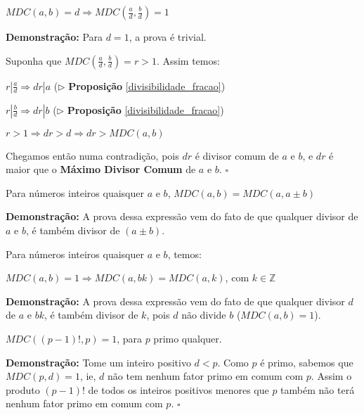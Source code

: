 \begin{proposition}\label{divisibilidade_mdc}
$MDC(a,b) = d \Rightarrow MDC(\frac{a}{d}, \frac{b}{d}) = 1$
\end{proposition}
\textbf{Demonstração:}
Para $d = 1$, a prova é trivial.

Suponha que $MDC(\frac{a}{d}, \frac{b}{d}) = r > 1$. Assim temos:

$r|\frac{a}{d} \Rightarrow dr|a$ ($\triangleright$ \textbf{Proposição} \autoref{divisibilidade_fracao})

$r|\frac{b}{d} \Rightarrow dr|b$ ($\triangleright$ \textbf{Proposição} \autoref{divisibilidade_fracao})

$r > 1 \Rightarrow dr > d \Rightarrow dr > MDC(a,b)$

Chegamos então numa contradição, pois $dr$ é divisor comum de $a$ e $b$, e $dr$ é maior que o \textbf{Máximo Divisor Comum} de $a$ e $b$. $\square$



\begin{proposition}\label{corolario_gcd_soma}
Para números inteiros quaisquer $a$ e $b$, $MDC(a,b) = MDC(a,a \pm b)$
\end{proposition}
\textbf{Demonstração:}
A prova dessa expressão vem do fato de que qualquer divisor de $a$ e $b$, é também divisor de $(a \pm b)$.



\begin{proposition}\label{corolario_gcd_produto}
Para números inteiros quaisquer $a$ e $b$, temos:

$MDC(a,b) = 1 \Rightarrow MDC(a,bk) = MDC(a,k)$, com $k \in \mathbb{Z}$
\end{proposition}
\textbf{Demonstração:}
A prova dessa expressão vem do fato de que qualquer divisor $d$ de $a$ e $bk$, é também divisor de $k$, pois $d$ não divide $b$ ($MDC(a,b) = 1$).
\\

\begin{corollary}\label{mdc_primo_fatorial}
$MDC((p-1)!, p)=1$, para $p$ primo qualquer.
\end{corollary}
\textbf{Demonstração:}
Tome um inteiro positivo $d < p$. Como $p$ é primo, sabemos que $MDC(p,d)=1$, ie, $d$ não tem nenhum fator primo em comum com $p$. Assim
o produto $(p-1)!$ de todos os inteiros positivos menores que $p$ também não terá nenhum fator primo em comum com $p$. $\square$
\\



